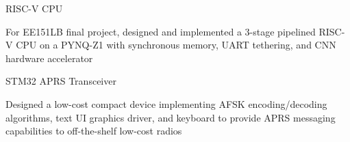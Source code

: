 \documentclass[11pt]{article}
\begin{document}
\rootend


\sectionproj
{RISC-V CPU} {}
{\begin{circlist}
	\item For EE151LB final project, designed and implemented a 3-stage pipelined RISC-V CPU on a PYNQ-Z1 with synchronous memory, UART tethering, and CNN hardware accelerator
\end{circlist}}

\sectionproj
{STM32 APRS Transceiver} {}
{\begin{circlist}
	\item Designed a low-cost compact device implementing AFSK encoding/decoding algorithms, text UI graphics driver, and keyboard to provide APRS messaging capabilities to off-the-shelf low-cost radios
\end{circlist}}

\rootend


\begin{indentsection}
\end{indentsection}
\end{document}
